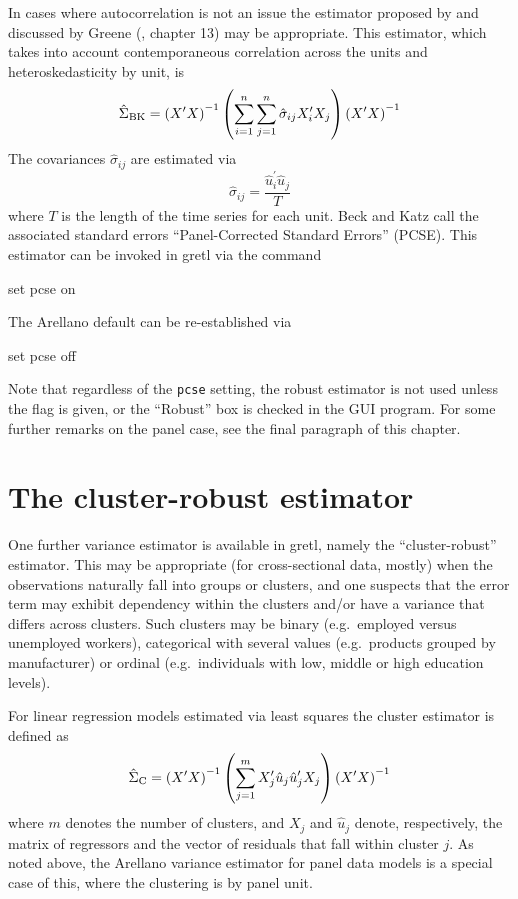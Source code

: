 In cases where autocorrelation is not an issue the estimator
proposed by \cite{beck-katz95} and discussed by Greene
(\citeyear{greene03}, chapter 13) may be appropriate.  This estimator,
which takes into account contemporaneous correlation across the units
and heteroskedasticity by unit, is
\[
\hat{\Sigma}_{\rm BK} = 
\left(X^{\prime}X\right)^{-1}
\left( \sum_{i=1}^n \sum_{j=1}^n \hat{\sigma}_{ij} X^{\prime}_iX_j \right)
\left(X^{\prime}X\right)^{-1}
\]
The covariances $\hat{\sigma}_{ij}$ are estimated via
\[
\hat{\sigma}_{ij} = \frac{\hat{u}^{\prime}_i \hat{u}_j}{T}
\]
where $T$ is the length of the time series for each unit.  Beck and
Katz call the associated standard errors ``Panel-Corrected Standard
Errors'' (PCSE).  This estimator can be invoked in gretl via the
command 
%
\begin{code}
set pcse on
\end{code}
%
The Arellano default can be re-established via 
%
\begin{code}
set pcse off
\end{code}
%
Note that regardless of the \texttt{pcse} setting, the robust
estimator is not used unless the  flag is given, or the
``Robust'' box is checked in the GUI program. For some further remarks
on the panel case, see the final paragraph of this chapter.

\section{The cluster-robust estimator}
\label{sec:vcv-cluster}

One further variance estimator is available in gretl, namely the
``cluster-robust'' estimator. This may be appropriate (for
cross-sectional data, mostly) when the observations naturally fall
into groups or clusters, and one suspects that the error term may
exhibit dependency within the clusters and/or have a variance that
differs across clusters. Such clusters may be binary (e.g.\ employed
versus unemployed workers), categorical with several values (e.g.\
products grouped by manufacturer) or ordinal (e.g.\ individuals with
low, middle or high education levels). 

For linear regression models estimated via least squares the cluster
estimator is defined as
\[
\hat{\Sigma}_{\rm C} = \left(X'X\right)^{-1} 
  \left(\sum_{j=1}^m X_j'\hat{u}_j \hat{u}_j' X_j\right)
  \left(X'X\right)^{-1}
\]
where $m$ denotes the number of clusters, and $X_j$ and $\hat{u}_j$
denote, respectively, the matrix of regressors and the vector of
residuals that fall within cluster $j$. As noted above, the Arellano
variance estimator for panel data models is a special case of this,
where the clustering is by panel unit.

